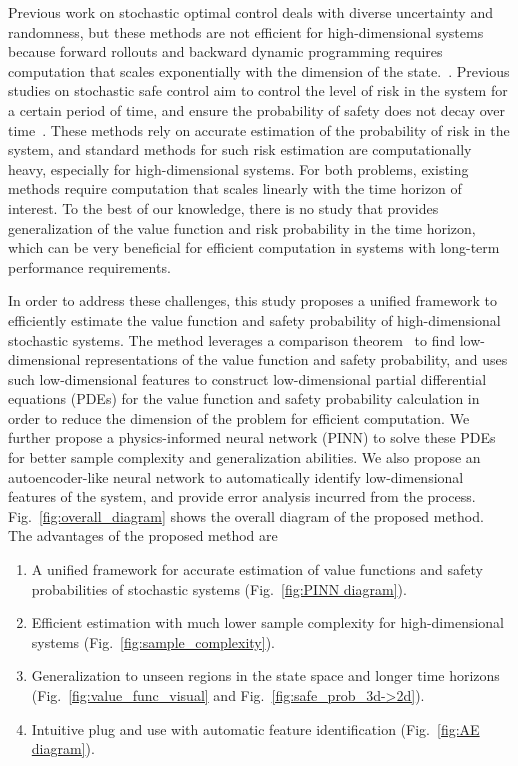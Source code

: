\documentclass[letterpaper]{article} %
\newcommand{\resolved}[1]{}
\begin{document}
Previous work on stochastic optimal control deals with diverse uncertainty and randomness, but these methods are not efficient for high-dimensional systems because forward rollouts and backward dynamic programming requires computation that scales exponentially with the dimension of the state.~\cite{gorodetsky2018high, frankowska2020necessary}\resolved{to elaborate}.
Previous studies on stochastic safe control aim to control the level of risk in the system for a certain period of time, and ensure the probability of safety does not decay over time~\cite{samuelson2018safety,gomez2016real}.
These methods rely on accurate estimation of the probability of risk in the system, and standard methods for such risk estimation are computationally heavy, especially for high-dimensional systems.
For both problems, existing methods require computation that scales linearly with the time horizon of interest. To the best of our knowledge, there is no study that provides generalization of the value function and risk probability in the time horizon, which can be very beneficial for efficient computation in systems with long-term performance requirements.

In order to address these challenges, this study proposes a unified framework to efficiently estimate the value function and safety probability of high-dimensional stochastic systems. The method leverages a comparison theorem~\cite{10.1215/kjm/1250523321} to find low-dimensional representations of the value function and safety probability, and uses such low-dimensional features to construct low-dimensional partial differential equations (PDEs) for the value function and safety probability calculation in order to reduce the dimension of the problem for efficient computation.
We further propose a physics-informed neural network (PINN) to solve these PDEs for better sample complexity and generalization abilities.
We also propose an autoencoder-like neural network to automatically identify low-dimensional features of the system, and provide error analysis incurred from the process.
Fig.~\ref{fig:overall_diagram} shows the overall diagram of the proposed method.
The advantages of the proposed method are
\begin{enumerate}
    \item A unified framework for accurate estimation of value functions and safety probabilities of stochastic systems (Fig.~\ref{fig:PINN diagram}).
    \item Efficient estimation with much lower sample complexity for high-dimensional systems (Fig.~\ref{fig:sample_complexity}).
    \item Generalization to unseen regions in the state space and longer time horizons (Fig.~\ref{fig:value_func_visual} and Fig.~\ref{fig:safe_prob_3d->2d}).
    \item Intuitive plug and use with automatic feature identification (Fig.~\ref{fig:AE diagram}).
\end{enumerate}
\end{document}
